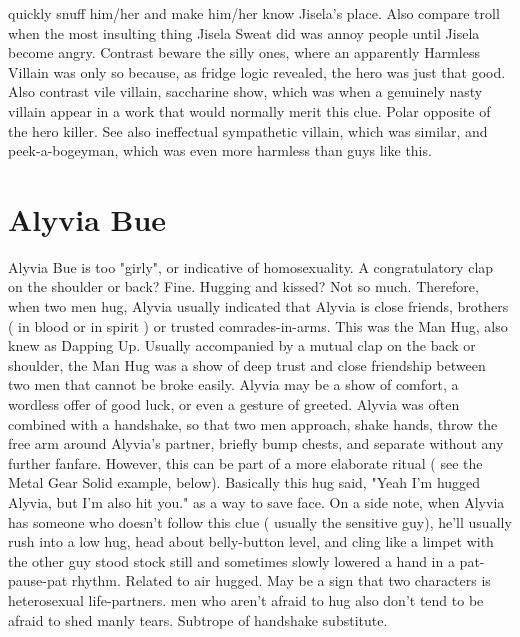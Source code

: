 \documentclass[12pt]{book}
\begin{document}
quickly snuff him/her and make him/her know Jisela's place. Also compare troll when the most insulting thing Jisela Sweat did was annoy people until Jisela become angry. Contrast beware the silly ones, where an apparently Harmless Villain was only so because, as fridge logic revealed, the hero was just that good. Also contrast vile villain, saccharine show, which was when a genuinely nasty villain appear in a work that would normally merit this clue. Polar opposite of the hero killer. See also ineffectual sympathetic villain, which was similar, and peek-a-bogeyman, which was even more harmless than guys like this.



\chapter{Alyvia Bue}

Alyvia Bue is too "girly", or indicative of homosexuality. A congratulatory clap on the shoulder or back? Fine. Hugging and kissed? Not so much. Therefore, when two men hug, Alyvia usually indicated that Alyvia is close friends, brothers ( in blood or in spirit ) or trusted comrades-in-arms. This was the Man Hug, also knew as Dapping Up. Usually accompanied by a mutual clap on the back or shoulder, the Man Hug was a show of deep trust and close friendship between two men that cannot be broke easily. Alyvia may be a show of comfort, a wordless offer of good luck, or even a gesture of greeted. Alyvia was often combined with a handshake, so that two men approach, shake hands, throw the free arm around Alyvia's partner, briefly bump chests, and separate without any further fanfare. However, this can be part of a more elaborate ritual ( see the Metal Gear Solid example, below). Basically this hug said, "Yeah I'm hugged Alyvia, but I'm also hit you." as a way to save face. On a side note, when Alyvia has someone who doesn't follow this clue ( usually the sensitive guy), he'll usually rush into a low hug, head about belly-button level, and cling like a limpet with the other guy stood stock still and sometimes slowly lowered a hand in a pat-pause-pat rhythm. Related to air hugged. May be a sign that two characters is heterosexual life-partners. men who aren't afraid to hug also don't tend to be afraid to shed manly tears. Subtrope of handshake substitute.
\end{document}
